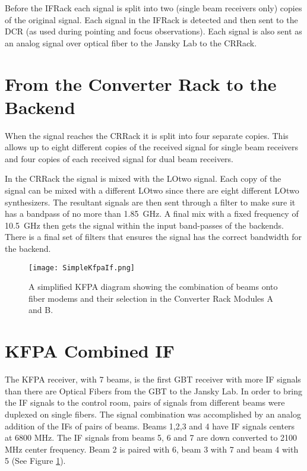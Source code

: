 Before the \gls{IFRack} each signal is split into two (single beam receivers only)
copies of the original signal. Each signal in the \gls{IFRack} is detected and then
sent to the \gls{DCR} (as used during pointing and focus observations).  Each signal
is also sent as an analog signal over optical fiber to the Jansky Lab to the \gls{CRRack}.

\newpage
\section{From the Converter Rack to the Backend}

When the signal reaches the \gls{CRRack} it is split into four separate copies.
This allows up to eight different copies of the received signal for single beam
receivers and four copies of each received signal for dual beam receivers.  

In the \gls{CRRack} the signal is mixed with the \gls{LOtwo} signal.  Each copy
of the signal can be mixed with a different \gls{LOtwo} since there are eight
different \gls{LOtwo} synthesizers.  The resultant signals are then sent through
a filter to make sure it has a bandpass of no more than 1.85~GHz.  A final mix
with a fixed frequency of 10.5~GHz then gets the signal within the input band-passes
of the backends.  There is a final set of filters that ensures the signal has the 
correct bandwidth for the backend.

\begin{figure}[!h]
\begin{center}
\texttt{[image: SimpleKfpaIf.png]}
\caption[KFPA IF system chart]
{A simplified KFPA diagram showing the combination of beams onto fiber modems
and their selection in the Converter Rack Modules A and B.
\label{fig:kfpaIf}
}
\end{center}
\end{figure}

\section{KFPA Combined IF}\label{sec:KfpaIF}

The KFPA receiver, with 7 beams, is the first GBT receiver with more \gls{IF}
signals than there are Optical Fibers from the GBT to the Jansky Lab. In order to
bring the \gls{IF} signals to the control room, pairs of signals from different
beams were duplexed on single fibers. The signal combination was accomplished by
an analog addition of the \glspl{IF} of pairs of beams.   Beams 1,2,3 and 4
have \gls{IF} signals centers at 6800 MHz. The \gls{IF} signals from beams
5, 6 and 7 are down converted to 2100 MHz center frequency.  Beam 2 is paired
with 6, beam 3 with 7 and beam 4 with 5 (See Figure \ref{fig:kfpaIf}).

